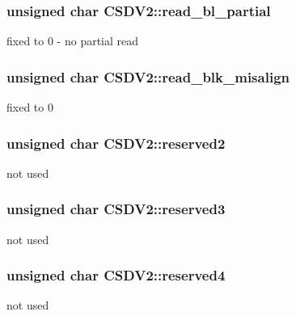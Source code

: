 \subsubsection[{\texorpdfstring{read\+\_\+bl\+\_\+partial}{read_bl_partial}}]{\setlength{\rightskip}{0pt plus 5cm}unsigned char C\+S\+D\+V2\+::read\+\_\+bl\+\_\+partial}\hypertarget{struct_c_s_d_v2_ac65ab71e8c96fd52f91431762c2b4bd8}{}\label{struct_c_s_d_v2_ac65ab71e8c96fd52f91431762c2b4bd8}
fixed to 0 -\/ no partial read 
\subsubsection[{\texorpdfstring{read\+\_\+blk\+\_\+misalign}{read_blk_misalign}}]{\setlength{\rightskip}{0pt plus 5cm}unsigned char C\+S\+D\+V2\+::read\+\_\+blk\+\_\+misalign}\hypertarget{struct_c_s_d_v2_ab66c3e7d5735885b0b3799870e6caf20}{}\label{struct_c_s_d_v2_ab66c3e7d5735885b0b3799870e6caf20}
fixed to 0 
\subsubsection[{\texorpdfstring{reserved2}{reserved2}}]{\setlength{\rightskip}{0pt plus 5cm}unsigned char C\+S\+D\+V2\+::reserved2}\hypertarget{struct_c_s_d_v2_a01c91890e37265b96efa7cd3bde25d2c}{}\label{struct_c_s_d_v2_a01c91890e37265b96efa7cd3bde25d2c}
not used 
\subsubsection[{\texorpdfstring{reserved3}{reserved3}}]{\setlength{\rightskip}{0pt plus 5cm}unsigned char C\+S\+D\+V2\+::reserved3}\hypertarget{struct_c_s_d_v2_a0887f10de0b3c907a56f8a89d925e1a1}{}\label{struct_c_s_d_v2_a0887f10de0b3c907a56f8a89d925e1a1}
not used 
\subsubsection[{\texorpdfstring{reserved4}{reserved4}}]{\setlength{\rightskip}{0pt plus 5cm}unsigned char C\+S\+D\+V2\+::reserved4}\hypertarget{struct_c_s_d_v2_a50b06e2c85cc95c0adc08b18c97d7cb3}{}\label{struct_c_s_d_v2_a50b06e2c85cc95c0adc08b18c97d7cb3}
not used 

